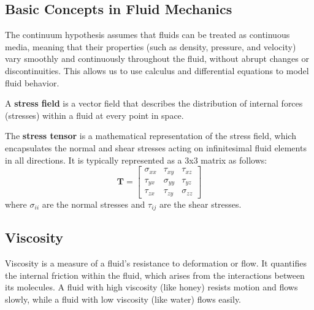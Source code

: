 \documentclass[11pt]{report}
\begin{document}
\subsection{Basic Concepts in Fluid Mechanics}
\begin{definition}
    The continuum hypothesis assumes that fluids can be treated as continuous media, meaning that their properties (such as density, pressure, and velocity) vary smoothly and continuously throughout the fluid, without abrupt changes or discontinuities. This allows us to use calculus and differential equations to model fluid behavior.
\end{definition}
\begin{definition}
    A \textbf{stress field} is a vector field that describes the distribution of internal forces (stresses) within a fluid at every point in space. 
    
    The \textbf{stress tensor} is a mathematical representation of the stress field, which encapsulates the normal and shear stresses acting on infinitesimal fluid elements in all directions. It is typically represented as a 3x3 matrix as follows:
    \[\mathbf{T} = \begin{bmatrix}
    \sigma_{xx} & \tau_{xy} & \tau_{xz} \\
    \tau_{yx} & \sigma_{yy} & \tau_{yz} \\
    \tau_{zx} & \tau_{zy} & \sigma_{zz}
    \end{bmatrix}\]
    where \(\sigma_{ii}\) are the normal stresses and \(\tau_{ij}\) are the shear stresses.
    
\end{definition}

\subsection{Viscosity}
\begin{definition}[Viscosity]
    Viscosity is a measure of a fluid's resistance to deformation or flow. It quantifies the internal friction within the fluid, which arises from the interactions between its molecules. A fluid with high viscosity (like honey) resists motion and flows slowly, while a fluid with low viscosity (like water) flows easily.
\end{definition}
\end{document}
